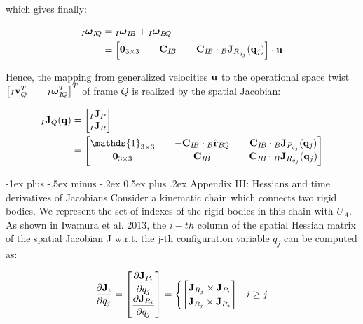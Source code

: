 \documentclass[10pt,landscape,a4paper]{article}
\makeatletter
\renewcommand{\section}{\@startsection{section}{1}{0mm}%
                               {-1ex plus -.5ex minus -.2ex}%
                                {0.5ex plus .2ex}%
                                {\normalfont\large\bfseries}}
\newcommand\identity{\mathds{1}}
\newcommand\poshat[3]{{}_#1\hat{\vr}_{#2\!#3}}
\newcommand\comat[2]{\vC_{#1\!#2}}
\newcommand\rotvel[3]{{}_#1\vom_{#2\!#3}}
\makeatother
\begin{document}
\begin{multicols}{2}
which gives finally:

\begin{equation}
\begin{aligned}
\rotvel{I}{I}{Q}
&= \rotvel{I}{I}{B} + \rotvel{I}{B}{Q} \\
&= 
\begin{bmatrix}
\mathbf{0}_{3 \times 3} && \comat{I}{B} && \comat{I}{B} \cdot {}_B \vJ_{R_{q_j}}(\vq_j)
\end{bmatrix}
\cdot \vu
\end{aligned}
\end{equation}

Hence, the mapping from generalized velocities $\mathbf u$ to the operational space twist $\begin{bmatrix}{}_I \vv_{Q}^T && \rotvel{I}{I}{Q}^T \end{bmatrix}^T$ of frame $Q$ is realized by the spatial Jacobian:

\begin{equation}
\begin{aligned}
{}_I \vJ_Q(\vq)
&=
\begin{bmatrix}
{}_I \vJ_P \\
{}_I \vJ_R
\end{bmatrix} \\
&=
\begin{bmatrix}
\identity_{3\times 3} && -\comat{I}{B} \cdot \poshat{B}{B}{Q} && \comat{I}{B} \cdot {}_B \vJ_{P_{q_j}}(\vq_j) \\
\mathbf{0}_{3 \times 3} && \comat{I}{B} && \comat{I}{B} \cdot {}_B \vJ_{R_{q_j}}(\vq_j)
\end{bmatrix}
\end{aligned}
\end{equation}

\section{Appendix III: Hessians and time derivatives of Jacobians}
Consider a kinematic chain which connects two rigid bodies. We represent the set of indexes of the rigid bodies in this chain with $U_A$. As shown in Iwamura et al. 2013, the $i-th$ column of the spatial Hessian matrix of the spatial Jacobian J w.r.t. the j-th configuration variable $q_j$ can be computed as:

\begin{equation}
\dfrac{\partial \mathbf J_i}{\partial q_j}
= \begin{bmatrix}
\dfrac{\partial \mathbf J_{P_i}}{\partial q_j} \\ \dfrac{\partial \mathbf J_{R_i}}{\partial q_j}
\end{bmatrix}
=
\begin{cases}
\begin{bmatrix}
\mathbf J_{R_j} \times \mathbf J_{P_i}\\ 
\mathbf J_{R_j} \times \mathbf J_{R_i}
\end{bmatrix} & i \ge j \\


\end{cases}
\end{equation}
\end{multicols}
\end{document}
